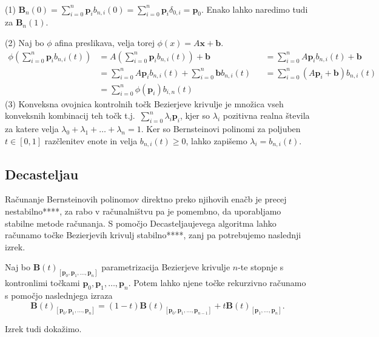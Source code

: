 \documentclass[isrm2, tisk]{fmfdelo}
\newcommand{\p}{\textbf{p}}
\newcommand{\lilb}[2]{b_{#1,#2}(t)}
\newcommand{\bigbbod}[2]{\textbf{B}_{#1}(#2)}
\newcommand{\bigbbt}{\textbf{B}(t)}
\newcommand{\bernsteinsumtritri}[3]{\sum_{#1=0}^{#2} #3\lilb{#1}{#2}}
\begin{document}
    \begin{dokaz}
        ~\\
        \noindent (1) $\bigbbod{n}{0}=\sum_{i=0}^{n}\p_{i}b_{n,i}(0) = \sum_{i=0}^{n}\p_{i}\delta_{0,i} = \p_0$.
        Enako lahko naredimo tudi za $\bigbbod{n}{1}.$

        \noindent (2) Naj bo $\phi$ afina preslikava, velja torej $\phi(x) = A\mathbf{x} + \mathbf{b}.$
        \begin{align*}
            \phi\left(\sum_{i=0}^{n}\p_{i}b_{n,i}(t)\right) &= A\left(\sum_{i=0}^{n}\p_{i}b_{n,i}(t)\right) + \mathbf{b} &&=  \sum_{i=0}^{n}A\p_{i}b_{n,i}(t) + \mathbf{b}  \\
            &= \sum_{i=0}^{n}A\p_{i}b_{n,i}(t) + \sum_{i=0}^{n}\mathbf{b}b_{n,i}(t) &&= \sum_{i=0}^{n}(A\p_{i}+\mathbf{b})b_{n,i}(t) \\
            &= \bernsteinsumtritri{i}{n}{\phi(\p_i)}
        \end{align*}
        \noindent (3) Konveksna ovojnica kontrolnih točk Bezierjeve krivulje je množica vseh konveksnih kombinacij teh točk t.j.\ $\sum_{i=0}^{n}\lambda_i\p_{i}$, kjer so $\lambda_i$ pozitivna realna števila za katere velja $\lambda_0 + \lambda_1 + \dots + \lambda_n = 1$.
        Ker so Bernsteinovi polinomi za poljuben $t\in[0,1]$ razčlenitev enote in velja $\lilb{n}{i}\geq0$, lahko zapišemo $\lambda_i=\lilb{n}{i}$.
    \end{dokaz}

    \subsection{Decasteljau}
    Računanje Bernsteinovih polinomov direktno preko njihovih enačb je precej nestabilno****, za rabo v računalništvu pa je pomembno, da uporabljamo stabilne metode računanja.
    S pomočjo Decasteljaujevega algoritma lahko računamo točke Bezierjevih krivulj stabilno****, zanj pa potrebujemo naslednji izrek.

    \begin{izrek}
        Naj bo $\bigbbt_{[\p_0,\p_1,\dots,\p_n]}$ parametrizacija Bezierjeve krivulje $n$-te stopnje s kontronlimi točkami $\p_0,\p_1,\dots,\p_n$.
        Potem lahko njene točke rekurzivno računamo s pomočjo naslednjega izraza \[\bigbbt_{[\p_0,\p_1,\dots,\p_n]} = (1-t)\bigbbt_{[\p_0,\p_1,\dots,\p_{n-1}]} +t\bigbbt_{[\p_1,\dots,\p_n]}.\]
    \end{izrek}

    Izrek tudi dokažimo.
\end{document}
